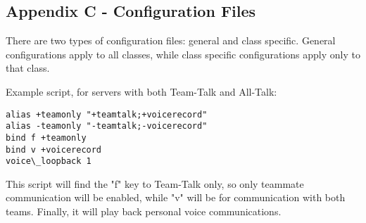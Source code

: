 \subsection{Appendix C - Configuration Files}
There are two types of configuration files: general and class specific. General configurations apply to all classes, while class specific configurations apply only to that class. 

Example script, for servers with both Team-Talk and All-Talk:
\begin{lstlisting}
alias +teamonly "+teamtalk;+voicerecord"
alias -teamonly "-teamtalk;-voicerecord"
bind f +teamonly
bind v +voicerecord
voice\_loopback 1
\end{lstlisting}

This script will find the "f" key to Team-Talk only, so only teammate communication will be enabled, while "v" will be for communication with both teams.  Finally, it will play back personal voice communications.